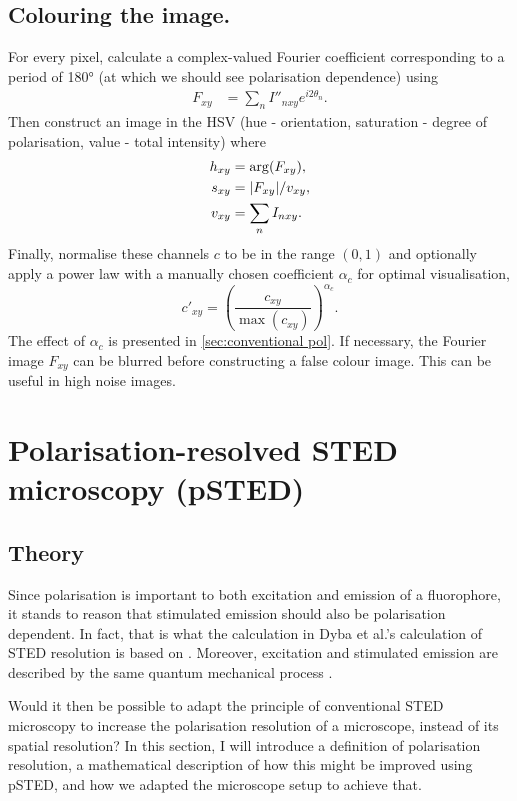 \subsection{Colouring the image.} For every pixel, calculate a complex-valued Fourier coefficient corresponding to a period of \ang{180} (at which we should see polarisation dependence) using
\begin{align}
	F_{xy} &= \sum_n I''_{nxy} e^{i2\theta_n}.
\end{align}
Then construct an image in the HSV (hue - orientation, saturation - degree of polarisation, value - total intensity) where 
\begin{align}
	h_{xy} &= \arg (F_{xy}),\\
	s_{xy} &= \abs{F_{xy}}/v_{xy},\\
	v_{xy} &= \sum_n I_{nxy}.
\end{align}
Finally, normalise these channels $ c $ to be in the range $ (0,1) $ and optionally apply a power law with a manually chosen coefficient $ \alpha_c $ for optimal visualisation,
\begin{equation}
	c'_{xy} = \left( \frac{c_{xy}}{\max (c_{xy})} \right)^{\alpha_c}.
\end{equation}
The effect of $ \alpha_c $ is presented in \autoref{sec:conventional pol}. If necessary, the Fourier image $ F_{xy} $ can be blurred before constructing a false colour image. This can be useful in high noise images.

\section{Polarisation-resolved STED microscopy (pSTED)}
\subsection{Theory}
\label{sec:psted theory}

Since polarisation is important to both excitation and emission of a fluorophore, it stands to reason that stimulated emission should also be polarisation dependent. In fact, that is what the calculation in Dyba et al.'s calculation of STED resolution is based on \cite{Harke2008, Dyba2005}. Moreover, excitation and stimulated emission are described by the same quantum mechanical process \cite{Foot}.

Would it then be possible to adapt the principle of conventional STED microscopy to increase the polarisation resolution of a microscope, instead of its spatial resolution? In this section, I will introduce a definition of polarisation resolution, a mathematical description of how this might be improved using pSTED, and how we adapted the microscope setup to achieve that. 

